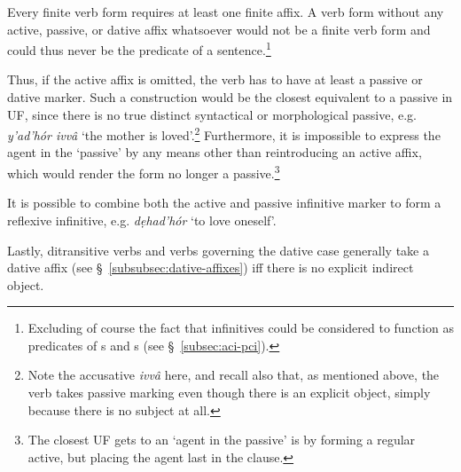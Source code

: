 \documentclass[a4paper, 12pt, twoside, final]{article}
\let \w \textit
\begin{document}
Every finite verb form requires at least one finite affix. A verb form without any active, passive, or dative affix whatsoever
would not be a finite verb form and could thus never be the predicate of a sentence.\footnote{Excluding of course the fact
that infinitives could be considered to function as predicates of s and s (see §~\ref{subsec:aci-pci}).}

Thus, if the active affix is omitted, the verb has to have at least a passive or dative marker.
Such a construction would be the closest equivalent to a passive in UF, since there is
no true distinct syntactical or morphological passive, e.g. \w{y’ad’hór ivvâ} ‘the mother is loved’.\footnote{Note the accusative
\textit{ivvâ} here, and recall also that, as mentioned above, the verb takes passive marking even though there is an explicit
object, simply because there is no subject at all.} Furthermore, it is impossible to express the agent
in the ‘passive’ by any
means other than reintroducing an active affix, which would render the form no longer a passive.\footnote{The closest
UF gets to an ‘agent in the passive’ is by forming a regular active, but placing the agent last in the clause.}

It is possible to combine both the active and passive infinitive marker to form a reflexive infinitive, e.g. \w{dẹhad’hór}
‘to love oneself’.

Lastly, ditransitive verbs and verbs governing the dative case generally take a dative affix (see
§~\ref{subsubsec:dative-affixes}) iff there is no explicit indirect object.
\end{document}
